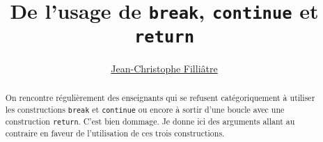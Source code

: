 \documentclass[a4paper,12pt]{article}
\title{De l'usage de \texttt{break}, \texttt{continue} et \texttt{return}}
\author{\href{https://www.lri.fr/~filliatr/index.fr.html}{Jean-Christophe Filliâtre}}
\begin{document}
\maketitle

\begin{abstract}
  On rencontre régulièrement des enseignants qui se refusent
  catégoriquement à utiliser les constructions \texttt{break} et
  \texttt{continue} ou encore à sortir d'une boucle avec une
  construction \texttt{return}. C'est bien dommage. Je donne ici des
  arguments allant au contraire en faveur de l'utilisation de ces
  trois constructions.
\end{abstract}

\end{document}
